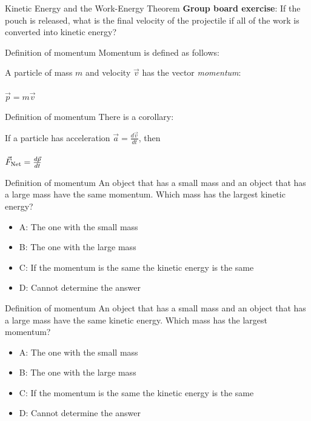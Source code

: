 \documentclass{beamer}
\begin{document}
\begin{frame}{Kinetic Energy and the Work-Energy Theorem}
\textbf{Group board exercise}: If the pouch is released, what is the final velocity of the projectile if all of the work is converted into kinetic energy?
\end{frame}

\begin{frame}{Definition of momentum}
Momentum is defined as follows: \\ \vspace{1cm}
\begin{tcolorbox}[colback=white,colframe=red!40!blue,title=Definition of Momentum]
\alert{A particle of mass $m$ and velocity $\vec{v}$ has the vector \textit{momentum}:} \\ \\
\alert{$\vec{p} = m\vec{v}$}
\end{tcolorbox}
\end{frame}

\begin{frame}{Definition of momentum}
There is a corollary: \\ \vspace{1cm}
\begin{tcolorbox}[colback=white,colframe=red!40!blue,title=Newton's Second Law with momentum]
\alert{If a particle has acceleration $\vec{a} = \frac{d\vec{v}}{dt}$, then} \\ \\
\alert{$\vec{F}_{\rm Net} = \frac{d\vec{p}}{dt}$}
\end{tcolorbox}
\end{frame}

\begin{frame}{Definition of momentum}
An object that has a small mass and an object that has a large mass have the same momentum. Which mass has the largest kinetic energy?
\begin{itemize}
\item A: The one with the small mass
\item B: The one with the large mass
\item C: If the momentum is the same the kinetic energy is the same
\item D: Cannot determine the answer
\end{itemize}
\end{frame}

\begin{frame}{Definition of momentum}
An object that has a small mass and an object that has a large mass have the same kinetic energy. Which mass has the largest momentum?
\begin{itemize}
\item A: The one with the small mass
\item B: The one with the large mass
\item C: If the momentum is the same the kinetic energy is the same
\item D: Cannot determine the answer
\end{itemize}
\end{frame}
\end{document}
